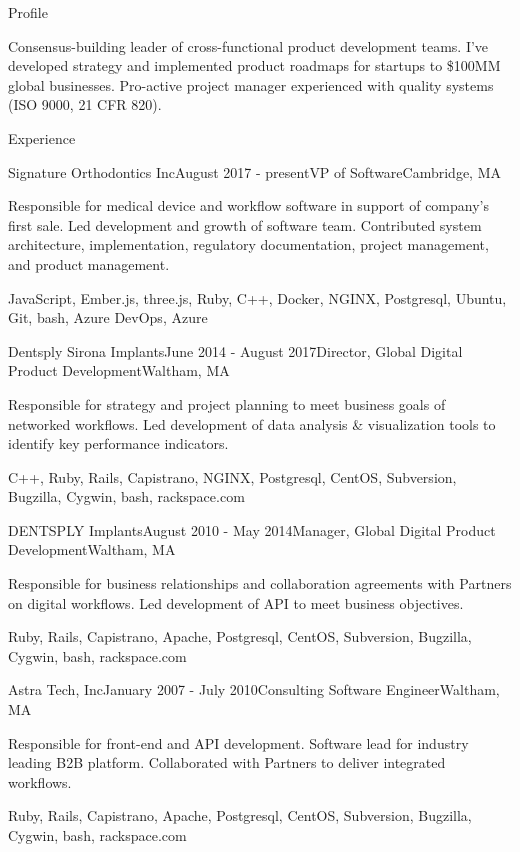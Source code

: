 \documentclass{resume}
\begin{document}
  
\begin{rSection}{Profile}
\item Consensus-building leader of cross-functional product development teams. I've developed strategy and implemented product roadmaps for startups to \$100MM global businesses. Pro-active project manager experienced with quality systems (ISO 9000, 21 CFR 820).
\end{rSection}

\begin{rSection}{Experience}

\begin{rSubsection}{Signature Orthodontics Inc}{August 2017 - present}{VP of Software}{Cambridge, MA}
\item Responsible for medical device and workflow software in support of company's first sale.  Led development and growth of software team. Contributed system architecture, implementation, regulatory documentation, project management, and product management.
\item JavaScript, Ember.js, three.js, Ruby, C++, Docker, NGINX, Postgresql, Ubuntu, Git, bash, Azure DevOps, Azure
\end{rSubsection}


\begin{rSubsection}{Dentsply Sirona Implants}{June 2014 - August 2017}{Director, Global Digital Product Development}{Waltham, MA}
\item Responsible for strategy and project planning to meet business goals of networked workflows.  Led development of data analysis & visualization tools to identify key performance indicators.
\item C++, Ruby, Rails, Capistrano, NGINX, Postgresql, CentOS, Subversion, Bugzilla, Cygwin, bash, rackspace.com
\end{rSubsection}

\begin{rSubsection}{DENTSPLY Implants}{August 2010 - May 2014}{Manager, Global Digital Product Development}{Waltham, MA}
\item Responsible for business relationships and collaboration agreements with Partners on digital workflows.  Led development of API to meet business objectives.
\item Ruby, Rails, Capistrano, Apache, Postgresql, CentOS, Subversion, Bugzilla, Cygwin, bash, rackspace.com
\end{rSubsection}


\begin{rSubsection}{Astra Tech, Inc}{January 2007 - July 2010}{Consulting Software Engineer}{Waltham, MA}
\item Responsible for front-end and API development. Software lead for industry leading B2B platform. Collaborated with Partners to deliver integrated workflows.
\item Ruby, Rails, Capistrano, Apache, Postgresql, CentOS, Subversion, Bugzilla, Cygwin, bash, rackspace.com
\end{rSubsection}



\end{rSection}
\end{document}
